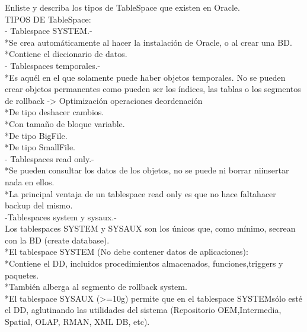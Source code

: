    \item Enliste y describa los tipos de TableSpace que existen en Oracle.\\
   TIPOS DE TableSpace:\\
   
   - Tablespace SYSTEM.-\\
   *Se crea automáticamente al hacer la instalación de Oracle, o al crear una BD.\\
   *Contiene el diccionario de datos.\\
   
   - Tablespaces temporales.-\\
   *Es aquél en el que solamente puede haber objetos temporales. No se pueden crear objetos permanentes como pueden ser los índices, las tablas o los segmentos de rollback -> Optimización operaciones deordenación\\
   *De tipo deshacer cambios.\\
   *Con tamaño de bloque variable.\\
   *De tipo BigFile.\\
   *De tipo SmallFile.\\
   
   - Tablespaces read only.-\\
   *Se pueden consultar los datos de los objetos, no se puede ni borrar niinsertar nada en ellos.\\
   *La principal ventaja de un tablespace read only es que no hace faltahacer backup del mismo.\\
   
   -Tablespaces system y sysaux.-\\
   Los tablespaces SYSTEM y SYSAUX son los únicos que, como mínimo, secrean con la BD (create database).\\
   *El tablespace SYSTEM (No debe contener datos de aplicaciones):\\
   *Contiene el DD, incluidos procedimientos almacenados, funciones,triggers y paquetes.\\
   *También alberga al segmento de rollback system.\\
   *El tablespace SYSAUX (>=10g) permite que en el tablespace SYSTEMsólo esté el DD, aglutinando las utilidades del sistema (Repositorio OEM,Intermedia, Spatial, OLAP, RMAN, XML DB, etc).\\
   
   
